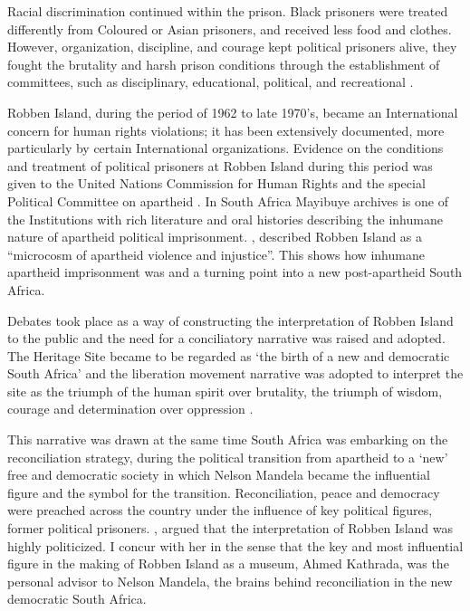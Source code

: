 Racial discrimination continued within the prison. Black prisoners were treated differently from Coloured or Asian prisoners, and received less food and clothes. However, organization, discipline, and courage kept political prisoners alive, they fought the brutality and harsh prison conditions through the establishment of committees, such as disciplinary, educational, political, and recreational \parencite[55]{Hutton_1997}.

Robben Island, during the period of 1962 to late 1970's, became an International concern for human rights violations; it has been extensively documented, more particularly by certain International organizations. Evidence on the conditions and treatment of political prisoners at Robben Island during this period was given to the United Nations Commission for Human Rights and the special Political Committee on apartheid \parencites{Alexander_1994}{Red_2009}.
In South Africa Mayibuye archives is one of the Institutions with rich literature and oral histories describing the inhumane nature of apartheid political imprisonment. \textcite[21]{Alexander_1994}, described Robben Island as a “microcosm of apartheid violence and injustice”. This shows how inhumane apartheid imprisonment was and a turning point into a new post-apartheid South Africa.


Debates took place as a way of constructing the interpretation of Robben Island to the public and the need for a conciliatory narrative was raised and adopted. The Heritage Site became to be regarded as ‘the birth of a new and democratic South Africa’ and the liberation movement narrative was adopted to interpret the site as the triumph of the human spirit over brutality, the triumph of wisdom, courage and determination over oppression \parencite[62--63]{Robben_2012}.

This narrative was drawn at the same time South Africa was embarking on the reconciliation strategy, during the political transition from apartheid to a ‘new’ free and democratic society in which Nelson Mandela became the influential figure and the symbol for the transition. Reconciliation, peace and democracy were preached across the country under the influence of key political figures, former political prisoners. \textcite[43--48]{Nesje_2005}, argued that the interpretation of Robben Island was highly politicized. I concur with her in the sense that the key and most influential figure in the making of Robben Island as a museum, Ahmed Kathrada, was the personal advisor to Nelson Mandela, the brains behind reconciliation in the new democratic South Africa.

